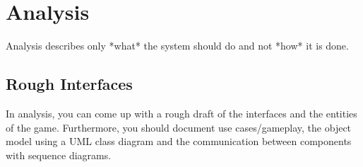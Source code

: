 \section{Analysis}
Analysis describes only *what* the system should do and not *how* it is done.

\subsection{Rough Interfaces}
In analysis, you can come up with a rough draft of the interfaces and the entities of the game.
Furthermore, you should document use cases/gameplay, the object model using a UML class diagram and the communication between components with sequence diagrams.